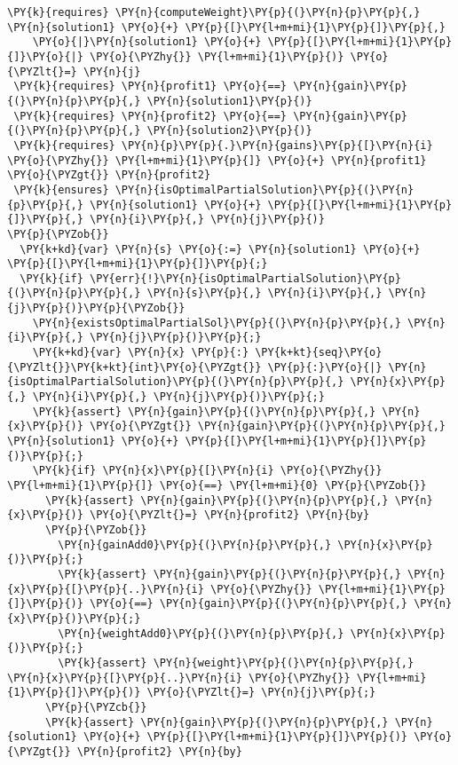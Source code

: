 \begin{sloppypar}
\begin{enumerate}
\begin{Verbatim}[commandchars=\\\{\}]
 \PY{k}{requires} \PY{n}{computeWeight}\PY{p}{(}\PY{n}{p}\PY{p}{,} \PY{n}{solution1} \PY{o}{+} \PY{p}{[}\PY{l+m+mi}{1}\PY{p}{]}\PY{p}{,} 
    \PY{o}{|}\PY{n}{solution1} \PY{o}{+} \PY{p}{[}\PY{l+m+mi}{1}\PY{p}{]}\PY{o}{|} \PY{o}{\PYZhy{}} \PY{l+m+mi}{1}\PY{p}{)} \PY{o}{\PYZlt{}=} \PY{n}{j}
 \PY{k}{requires} \PY{n}{profit1} \PY{o}{==} \PY{n}{gain}\PY{p}{(}\PY{n}{p}\PY{p}{,} \PY{n}{solution1}\PY{p}{)}
 \PY{k}{requires} \PY{n}{profit2} \PY{o}{==} \PY{n}{gain}\PY{p}{(}\PY{n}{p}\PY{p}{,} \PY{n}{solution2}\PY{p}{)}
 \PY{k}{requires} \PY{n}{p}\PY{p}{.}\PY{n}{gains}\PY{p}{[}\PY{n}{i} \PY{o}{\PYZhy{}} \PY{l+m+mi}{1}\PY{p}{]} \PY{o}{+} \PY{n}{profit1} \PY{o}{\PYZgt{}} \PY{n}{profit2}
 \PY{k}{ensures} \PY{n}{isOptimalPartialSolution}\PY{p}{(}\PY{n}{p}\PY{p}{,} \PY{n}{solution1} \PY{o}{+} \PY{p}{[}\PY{l+m+mi}{1}\PY{p}{]}\PY{p}{,} \PY{n}{i}\PY{p}{,} \PY{n}{j}\PY{p}{)}
\PY{p}{\PYZob{}}
  \PY{k+kd}{var} \PY{n}{s} \PY{o}{:=} \PY{n}{solution1} \PY{o}{+} \PY{p}{[}\PY{l+m+mi}{1}\PY{p}{]}\PY{p}{;}
  \PY{k}{if} \PY{err}{!}\PY{n}{isOptimalPartialSolution}\PY{p}{(}\PY{n}{p}\PY{p}{,} \PY{n}{s}\PY{p}{,} \PY{n}{i}\PY{p}{,} \PY{n}{j}\PY{p}{)}\PY{p}{\PYZob{}}
    \PY{n}{existsOptimalPartialSol}\PY{p}{(}\PY{n}{p}\PY{p}{,} \PY{n}{i}\PY{p}{,} \PY{n}{j}\PY{p}{)}\PY{p}{;}
    \PY{k+kd}{var} \PY{n}{x} \PY{p}{:} \PY{k+kt}{seq}\PY{o}{\PYZlt{}}\PY{k+kt}{int}\PY{o}{\PYZgt{}} \PY{p}{:}\PY{o}{|} \PY{n}{isOptimalPartialSolution}\PY{p}{(}\PY{n}{p}\PY{p}{,} \PY{n}{x}\PY{p}{,} \PY{n}{i}\PY{p}{,} \PY{n}{j}\PY{p}{)}\PY{p}{;}
    \PY{k}{assert} \PY{n}{gain}\PY{p}{(}\PY{n}{p}\PY{p}{,} \PY{n}{x}\PY{p}{)} \PY{o}{\PYZgt{}} \PY{n}{gain}\PY{p}{(}\PY{n}{p}\PY{p}{,} \PY{n}{solution1} \PY{o}{+} \PY{p}{[}\PY{l+m+mi}{1}\PY{p}{]}\PY{p}{)}\PY{p}{;}
    \PY{k}{if} \PY{n}{x}\PY{p}{[}\PY{n}{i} \PY{o}{\PYZhy{}} \PY{l+m+mi}{1}\PY{p}{]} \PY{o}{==} \PY{l+m+mi}{0} \PY{p}{\PYZob{}}
      \PY{k}{assert} \PY{n}{gain}\PY{p}{(}\PY{n}{p}\PY{p}{,} \PY{n}{x}\PY{p}{)} \PY{o}{\PYZlt{}=} \PY{n}{profit2} \PY{n}{by} 
      \PY{p}{\PYZob{}}
        \PY{n}{gainAdd0}\PY{p}{(}\PY{n}{p}\PY{p}{,} \PY{n}{x}\PY{p}{)}\PY{p}{;}
        \PY{k}{assert} \PY{n}{gain}\PY{p}{(}\PY{n}{p}\PY{p}{,} \PY{n}{x}\PY{p}{[}\PY{p}{..}\PY{n}{i} \PY{o}{\PYZhy{}} \PY{l+m+mi}{1}\PY{p}{]}\PY{p}{)} \PY{o}{==} \PY{n}{gain}\PY{p}{(}\PY{n}{p}\PY{p}{,} \PY{n}{x}\PY{p}{)}\PY{p}{;}
        \PY{n}{weightAdd0}\PY{p}{(}\PY{n}{p}\PY{p}{,} \PY{n}{x}\PY{p}{)}\PY{p}{;}
        \PY{k}{assert} \PY{n}{weight}\PY{p}{(}\PY{n}{p}\PY{p}{,} \PY{n}{x}\PY{p}{[}\PY{p}{..}\PY{n}{i} \PY{o}{\PYZhy{}} \PY{l+m+mi}{1}\PY{p}{]}\PY{p}{)} \PY{o}{\PYZlt{}=} \PY{n}{j}\PY{p}{;}
      \PY{p}{\PYZcb{}}
      \PY{k}{assert} \PY{n}{gain}\PY{p}{(}\PY{n}{p}\PY{p}{,} \PY{n}{solution1} \PY{o}{+} \PY{p}{[}\PY{l+m+mi}{1}\PY{p}{]}\PY{p}{)} \PY{o}{\PYZgt{}} \PY{n}{profit2} \PY{n}{by} 

\end{Verbatim}
\end{enumerate}
\end{sloppypar}
